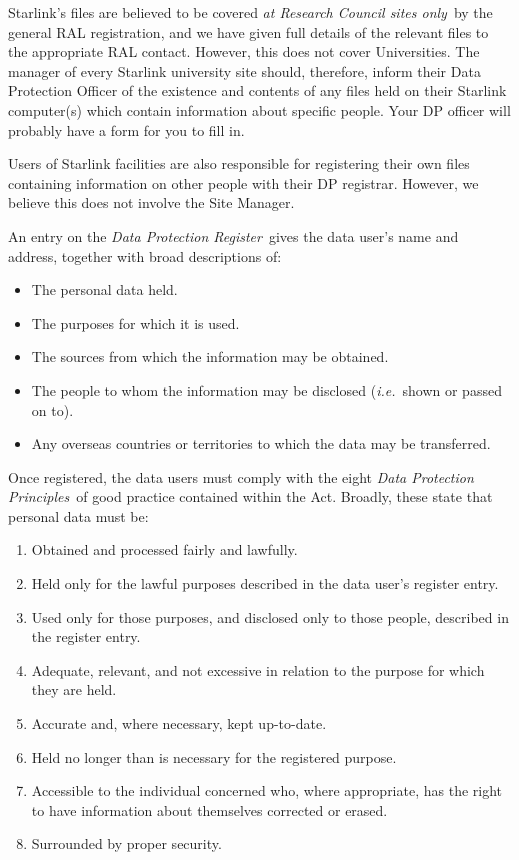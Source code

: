 Starlink's files are believed to be covered {\em at Research Council sites
only}\, by the general RAL registration, and we have given full details of the
relevant files to the appropriate RAL contact.
However, this does not cover Universities.
The manager of every Starlink university site should, therefore, inform
their Data Protection Officer of the existence and contents of any
files held on their Starlink computer(s) which contain information about
specific people.
Your DP officer will probably have a form for you to fill in.

Users of Starlink facilities are also responsible for registering their
own files containing information on other people with their DP registrar.
However, we believe this does not involve the Site Manager.

An entry on the {\em Data Protection Register}\, gives the data user's name and
address, together with broad descriptions of:

\begin{itemize}
\item The personal data held.
\item The purposes for which it is used.
\item The sources from which the information may be obtained.
\item The people to whom the information may be disclosed ({\em i.e.}\ shown or
 passed on to).
\item Any overseas countries or territories to which the data may be transferred.
\end{itemize}

Once registered, the data users must comply with the eight {\em Data Protection
Principles}\, of good practice contained within the Act.
Broadly, these state that personal data must be:

\begin{enumerate}
\item Obtained and processed fairly and lawfully.
\item Held only for the lawful purposes described in the data user's register
 entry.
\item Used only for those purposes, and disclosed only to those people,
 described in the register entry.
\item Adequate, relevant, and not excessive in relation to the purpose for which
 they are held.
\item Accurate and, where necessary, kept up-to-date.
\item Held no longer than is necessary for the registered purpose.
\item Accessible to the individual concerned who, where appropriate, has the
 right to have information about themselves corrected or erased.
\item Surrounded by proper security.
\end{enumerate}

